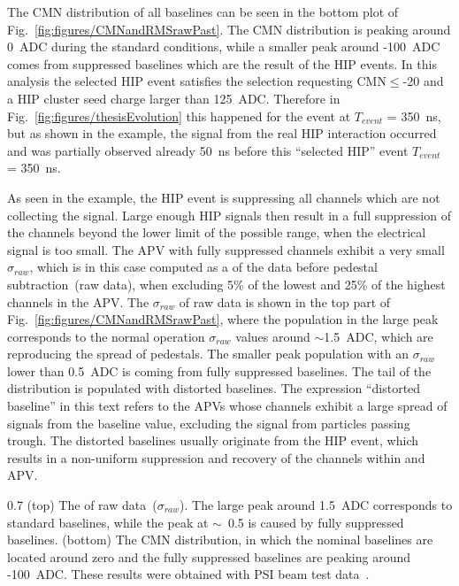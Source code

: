 The CMN distribution of all baselines can be seen in the bottom plot of Fig.~\ref{fig:figures/CMNandRMSrawPast}. The CMN distribution is peaking around 0~ADC during the standard conditions, while a smaller peak around -100~ADC comes from suppressed baselines which are the result of the HIP events. In this analysis the selected HIP event satisfies the selection requesting CMN$\leq$-20 and a HIP cluster seed charge larger than 125~ADC. Therefore in Fig.~\ref{fig:figures/thesisEvolution} this happened for the event at $T_{event}$ = 350~ns, but as shown in the example, the signal from the real HIP interaction occurred and was partially observed already 50~ns before this ``selected HIP'' event $T_{event}$ = 350~ns.

As seen in the example, the HIP event is suppressing all channels which are not collecting the signal. Large enough HIP signals then result in a full suppression of the channels beyond the lower limit of the possible range, when the electrical signal is too small. The APV with fully suppressed channels exhibit a very small $\sigma_{raw}$, which is in this case computed as a \SD of the data before pedestal subtraction~(raw data), when excluding 5\% of the lowest and 25\% of the highest channels in the APV. The \SD $\sigma_{raw}$ of raw data is shown in the top part of Fig.~\ref{fig:figures/CMNandRMSrawPast}, where the population in the large peak corresponds to the normal operation $\sigma_{raw}$ values around $\sim$1.5~ADC, which are reproducing the spread of pedestals. The smaller peak population with an $\sigma_{raw}$ lower than 0.5~ADC is coming from fully suppressed baselines. The tail of the distribution is populated with distorted baselines. The expression ``distorted baseline'' in this text refers to the APVs whose channels exhibit a large spread of signals from the baseline value, excluding the signal from particles passing trough. The distorted baselines usually originate from the HIP event, which results in a non-uniform suppression and recovery of the channels within and APV.

                 {0.7}       %
                 {(top) The \SD of raw data~($\sigma_{raw}$). The large peak around 1.5~ADC corresponds to standard baselines, while the peak at $\sim$~0.5 is caused by fully suppressed baselines. (bottom) The CMN distribution, in which the nominal baselines are located around zero and the fully suppressed baselines are peaking around -100~ADC. These results were obtained with PSI beam test data~\cite{Bainbridge:2004jc}.} %

